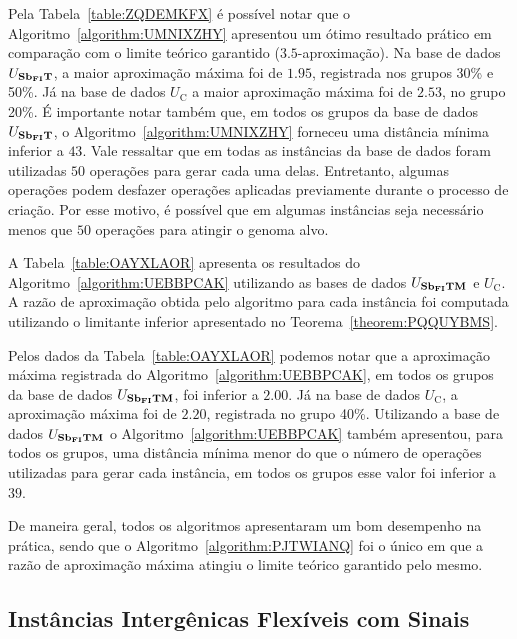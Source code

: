 Pela Tabela~\ref{table:ZQDEMKFX} é possível notar que o Algoritmo~\ref{algorithm:UMNIXZHY} apresentou um ótimo resultado prático em comparação com o limite teórico garantido ($3.5$-aproximação). Na base de dados $U_{\textbf{Sb\textsubscript{FI}T}}{}$, a maior aproximação máxima foi de $1.95$, registrada nos grupos 30\% e 50\%. Já na base de dados $U_{\text{C}}$ a maior aproximação máxima foi de $2.53$, no grupo 20\%. É importante notar também que, em todos os grupos da base de dados $U_{\textbf{Sb\textsubscript{FI}T}}{}$, o Algoritmo~\ref{algorithm:UMNIXZHY} forneceu uma distância mínima inferior a $43$. Vale ressaltar que em todas as instâncias da base de dados foram utilizadas $50$ operações para gerar cada uma delas. Entretanto, algumas operações podem desfazer operações aplicadas previamente durante o processo de criação. Por esse motivo, é possível que em algumas instâncias seja necessário menos que $50$ operações para atingir o genoma alvo.

A Tabela~\ref{table:OAYXLAOR} apresenta os resultados do Algoritmo~\ref{algorithm:UEBBPCAK} utilizando as bases de dados $U_{\textbf{Sb\textsubscript{FI}TM}}{}$ e $U_{\text{C}}$. A razão de aproximação obtida pelo algoritmo para cada instância foi computada utilizando o limitante inferior apresentado no Teorema~\ref{theorem:PQQUYBMS}.



Pelos dados da Tabela~\ref{table:OAYXLAOR} podemos notar que a aproximação máxima registrada do Algoritmo~\ref{algorithm:UEBBPCAK}, em todos os grupos da base de dados $U_{\textbf{Sb\textsubscript{FI}TM}}{}$, foi inferior a $2.00$. Já na base de dados $U_{\text{C}}$, a aproximação máxima foi de $2.20$, registrada no grupo 40\%. Utilizando a base de dados $U_{\textbf{Sb\textsubscript{FI}TM}}{}$ o Algoritmo~\ref{algorithm:UEBBPCAK} também apresentou, para todos os grupos, uma distância mínima menor do que o número de operações utilizadas para gerar cada instância, em todos os grupos esse valor foi inferior a $39$.

De maneira geral, todos os algoritmos apresentaram um bom desempenho na prática, sendo que o Algoritmo~\ref{algorithm:PJTWIANQ} foi o único em que a razão de aproximação máxima atingiu o limite teórico garantido pelo mesmo. 

\subsection{Instâncias Intergênicas Flexíveis com Sinais}

